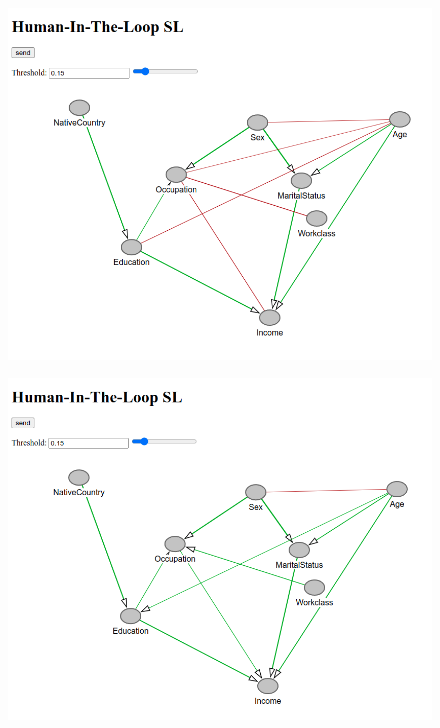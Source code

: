 \documentclass{beamer}
\begin{document}
\begin{frame}
	\begin{figure}
		\centering
		\includegraphics[scale=0.35]{3.png}
	\end{figure}
\end{frame}
\begin{frame}
	\begin{figure}
		\centering
		\includegraphics[scale=0.35]{4.png}
	\end{figure}
\end{frame}
\end{document}
